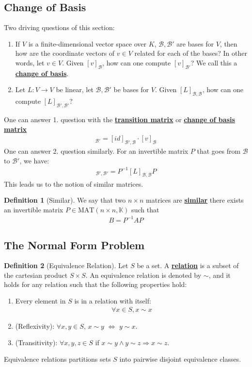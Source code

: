 \documentclass[11pt]{scrartcl}
\theoremstyle{definition}
\newtheorem{definition}{Definition}
\theoremstyle{remark}
\newcommand{\dfn}[1]{\textbf{\underline{#1}}}
\newcommand{\matn}[1]{\text{MAT}(n\times n, \mathbb{#1})}
\begin{document}
\subsection{Change of Basis}
Two driving questions of this section: 
\begin{enumerate}[noitemsep]
	\item If $V$ is a finite-dimensional vector space over $K$, $\mathcal{B}, \mathcal{B'}$ are bases for $V$, then how are the coordinate vectors of $v \in V$ related for each of the bases? In other words, let $v \in V$. Given $[v]_{\mathcal{B}}$, how can one compute $[v]_{\mathcal{B'}}$? We call this a \dfn{change of basis}. 
	\item Let $L: V \rightarrow V$ be linear, let $\mathcal{B}, \mathcal{B'}$ be bases for $V$. Given $[L]_{\mathcal{B}, \mathcal{B}}$, how can one compute $[L]_{\mathcal{B'}, \mathcal{B'}}$? 
\end{enumerate}
One can answer 1. question with the \dfn{transition matrix} or \dfn{change of basis matrix} 
\begin{align}
	[v]_{\mathcal{B'}} = [id]_{\mathcal{B', B}} \cdot [v]_{\mathcal{B}} 	
\end{align}
One can answer 2. question similarly.  For an invertible matrix $P$ that goes from $\mathcal{B}$ to $\mathcal{B'}$, we have: 
\begin{align}	
	[L]_{\mathcal{B', B'}} = P^{-1} [L]_{\mathcal{B,B}} P	
\end{align}
This leads us to the notion of similar matrices. 

\begin{definition}[Similar]
	We say that two $n \times n$ matrices are \dfn{similar} there exists an invertible matrix $P \in \matn{K}$ such that
	\begin{align}
		B = P^{-1} A P 	
	\end{align}
\end{definition}

\subsection{The Normal Form Problem}
\begin{definition}[Equivalence Relation] 
	Let $S$ be a set. A \dfn{relation} is a subset of the cartesian product $ S \times S$. An equivalence relation is denoted by $\sim$, and it holds for any relation such that the following properties hold:
	\begin{enumerate}[noitemsep]
		\item Every element in $S$ is in a relation with itself: 
		\begin{align}
			\forall x \in S, x \sim x 	
		\end{align}
		\item (Reflexivity): $\forall x, y \in S$, $x \sim y$ $\iff$ $y \sim x$. 
		\item (Transitivity): $\forall x, y, z \in S$ if $x \sim y \land y \sim z \Rightarrow x \sim z$. 
	\end{enumerate}
	Equivalence relations partitions sets $S$ into pairwise disjoint equivalence classes. 
\end{definition}
\end{document}
